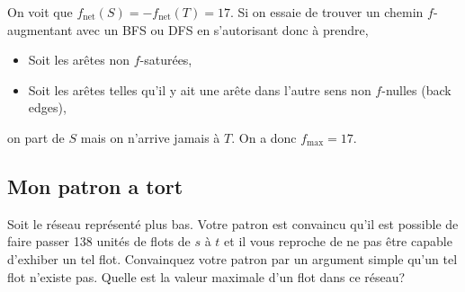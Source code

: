 \begin{solution}
  On voit que $f_\mathrm{net}(S) = -f_\mathrm{net}(T) = 17$.
  Si on essaie de trouver un chemin $f$-augmentant avec un BFS ou DFS
  en s'autorisant donc à prendre,
  \begin{itemize}
    \item Soit les arêtes non $f$-saturées,
    \item Soit les arêtes telles qu'il y ait une arête dans l'autre
      sens non $f$-nulles (back edges),
  \end{itemize}
  on part de $S$ mais on n’arrive jamais à $T$.
  On a donc $f_\mathrm{max} = 17$.
  \begin{center}
  \end{center}
\end{solution}


\subsection{Mon patron a tort}
Soit le réseau représenté plus bas. Votre patron est convaincu qu'il est possible de faire passer 138 unités de flots de $s$ à $t$ et il vous reproche de ne pas être capable d'exhiber un tel flot. Convainquez votre patron par un argument simple qu'un tel flot n'existe pas. Quelle est la valeur maximale d'un flot dans ce réseau?

